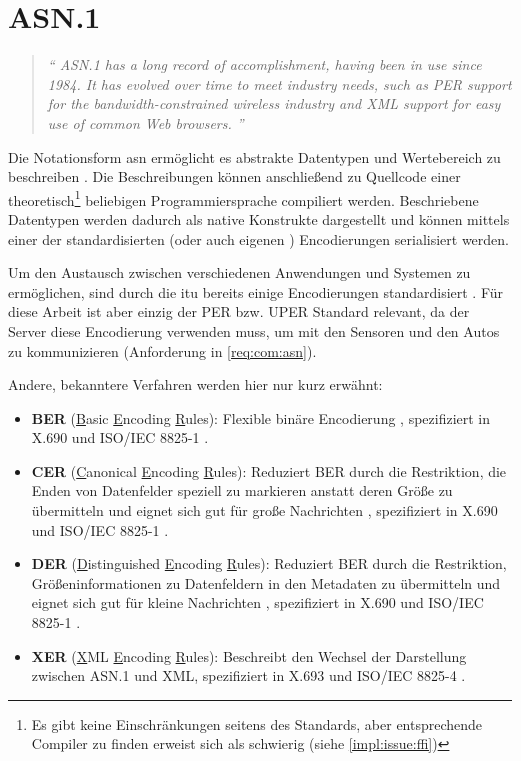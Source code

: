 
\section{ASN.1}

\begin{quotation}
	\textit{\enquote{
			ASN.1 has a long record of accomplishment, having been in use since 1984. It has evolved over time to meet industry needs, such as PER support for the bandwidth-constrained wireless industry and XML support for easy use of common Web browsers.
		}}
	\cite{asn:itu:asn.1}
\end{quotation}

Die Notationsform \gls{asn} ermöglicht es abstrakte Datentypen und Wertebereich zu beschreiben \cite{asn:layman}.
Die Beschreibungen können anschließend zu Quellcode einer theoretisch\footnote{Es gibt keine Einschränkungen seitens des Standards, aber entsprechende Compiler zu finden erweist sich als schwierig (siehe \autoref{impl:issue:ffi})} beliebigen Programmiersprache compiliert werden.
Beschriebene Datentypen werden dadurch als native Konstrukte dargestellt und können mittels einer der standardisierten (oder auch eigenen \cite{asn:itu:ecn}) Encodierungen serialisiert werden.

Um den Austausch zwischen verschiedenen Anwendungen und Systemen zu ermöglichen, sind durch die \gls{itu}  bereits einige Encodierungen standardisiert \cite[8]{asn:itu:x691}.
Für diese Arbeit ist aber einzig der PER bzw. UPER Standard relevant, da der Server diese Encodierung verwenden muss, um mit den Sensoren und den Autos zu kommunizieren (Anforderung in \autoref{req:com:asn}).

Andere, bekanntere Verfahren werden hier nur kurz erwähnt:
\begin{itemize}
	\item \textbf{BER} (\underline{B}asic \underline{E}ncoding \underline{R}ules): Flexible binäre Encodierung \cite{asn:wiki:x690}, spezifiziert in X.690 \cite{asn:itu:x690} und ISO/IEC 8825-1 \cite{asn:iso}.
	\item \textbf{CER} (\underline{C}anonical \underline{E}ncoding \underline{R}ules): Reduziert BER durch die Restriktion, die Enden von Datenfelder speziell zu markieren anstatt deren Größe zu übermitteln und eignet sich gut für große Nachrichten \cite{asn:wiki:x690}, spezifiziert in X.690 \cite{asn:itu:x690} und ISO/IEC 8825-1 \cite{asn:iso}.
	\item \textbf{DER} (\underline{D}istinguished \underline{E}ncoding \underline{R}ules): Reduziert BER durch die Restriktion, Größeninformationen zu Datenfeldern in den Metadaten zu übermitteln und eignet sich gut für kleine Nachrichten \cite{asn:wiki:x690}, spezifiziert in X.690 \cite{asn:itu:x690} und ISO/IEC 8825-1 \cite{asn:iso}.
	\item \textbf{XER} (\underline{X}ML \underline{E}ncoding \underline{R}ules): Beschreibt den Wechsel der Darstellung zwischen ASN.1 und XML, spezifiziert in X.693 \cite{asn:itu:x693} und ISO/IEC 8825-4 \cite{asn:iso}.
\end{itemize}

